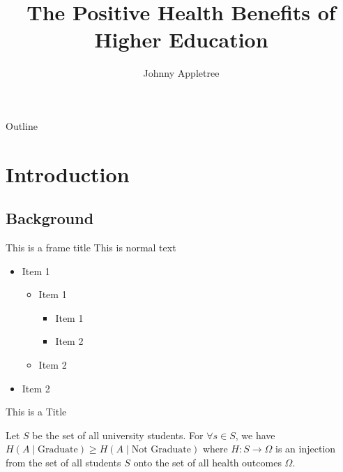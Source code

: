 

\title{The Positive Health Benefits of Higher Education}
\author{Johnny Appletree}



\begin{frame}
\titlepage
\end{frame}

\begin{frame}{Outline}
\tableofcontents
\end{frame}

\section{Introduction}
\subsection{Background}

\begin{frame}{This is a frame title}
\label{list}
This is normal text

\begin{itemize}
	\item Item 1
	\begin{itemize}
	\item Item 1
	\begin{itemize}
	\item Item 1
	\item Item 2
\end{itemize}
	\item Item 2
\end{itemize}
	\item Item 2
\end{itemize}
\end{frame}

\begin{frame}{This is a Title}
\begin{theorem}
Let $S$ be the set of all university students. For $\forall s \in S$, we have $H(A \mid \text{Graduate}) \geq H(A \mid \text{Not Graduate})$ where $H: S \rightarrow \Omega$ is an injection from the set of all students $S$ onto the set of all health outcomes $\Omega$.
\end{theorem}

                \hyperlink{list}{}
\end{frame}

